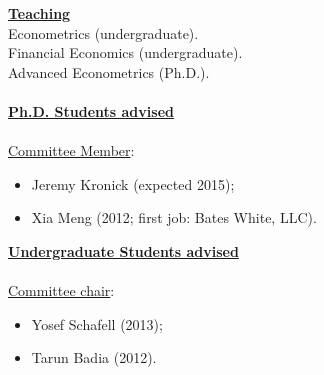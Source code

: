 \documentclass[12pt]{article}
\begin{document}
\underline{\textbf{Teaching}}\\
Econometrics (undergraduate).\\
Financial Economics (undergraduate). \\
Advanced Econometrics (Ph.D.). \\ \\
\underline{\textbf{Ph.D. Students advised}} \\ \\
\underline{Committee Member}: 
\begin{itemize}
	\item Jeremy Kronick (expected 2015);
	\item Xia Meng (2012; first job: Bates White, LLC). 
\end{itemize}
\clearpage
\underline{\textbf{Undergraduate Students advised}} \\ \\
\underline{Committee chair}: 
\begin{itemize}
	\item Yosef Schafell (2013);
	\item Tarun Badia (2012). 
\end{itemize}
\end{document}
